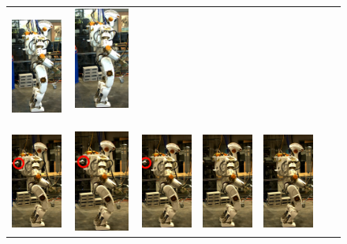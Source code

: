 \begin{figure}
\begin{tabular}{ccccccc}
    \includegraphics[width=0.7in]{STYLESTUFF/val6z_30} &
    \includegraphics[width=0.7in]{STYLESTUFF/val7z_30} ~\\[2ex]
     \includegraphics[width=0.7in]{STYLESTUFF/val1dr_C} &
    \includegraphics[width=0.7in]{STYLESTUFF/val2dr_30} &
    \includegraphics[width=0.7in]{STYLESTUFF/val3dr_30} &
    \includegraphics[width=0.7in]{STYLESTUFF/val4d_30} &
    \includegraphics[width=0.7in]{STYLESTUFF/val5d_30} &

\end{tabular}
\end{figure}
